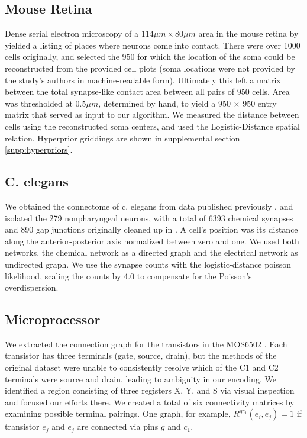 \documentclass{article}
\begin{document}


\subsection {Mouse Retina}
\label{supp:mouseretina}
Dense serial electron microscopy of a $114\mu m \times 80 \mu m $ area
in the mouse retina by \autocite{Helmstaedter2013} yielded a listing
of places where neurons come into contact. There were over 1000 cells
originally, and selected the $950$ for which the location of the soma
could be reconstructed from the provided cell plots (soma locations
were not provided by the study's authors in machine-readable
form). Ultimately this left a matrix between the total synapse-like
contact area between all pairs of 950 cells. Area was thresholded at
$0.5\mu m$, determined by hand, to yield a 950 $\times$ 950 entry
matrix that served as input to our algorithm. We measured the distance
between cells using the reconstructed soma centers, and used the
Logistic-Distance spatial relation. Hyperprior griddings are shown in
supplemental section \ref{supp:hyperpriors}.

\subsection{C. elegans}

We obtained the connectome of c. elegans from data published
previously \autocite{Varshney2011}, and isolated the 279 nonpharyngeal
neurons, with a total of 6393 chemical synapses and 890 gap junctions
originally cleaned up in \autocite{Chen2006}. A cell's position was
its distance along the anterior-posterior axis normalized between zero
and one. We used both networks, the chemical network as a directed
graph and the electrical network as undirected graph. We use the
synapse counts with the logistic-distance poisson likelihood, scaling
the counts by 4.0 to compensate for the Poisson's overdispersion.

\subsection{Microprocessor}
We extracted the connection graph for the transistors in the MOS6502
\autocite{visual6502source}. Each transistor has three terminals (gate,
source, drain), but the methods of the original dataset were unable to
consistently resolve which of the C1 and C2 terminals were source and
drain, leading to ambiguity in our encoding. We identified a region
consisting of three registers X, Y, and S via visual
inspection and focused our efforts there. We created a total of six
connectivity matrices by examining possible terminal pairings. One
graph, for example, $R^{gc_1}(e_i, e_j)=1$ if transistor $e_j$ and
$e_j$ are connected via pins $g$ and $c_1$. 
\end{document}
